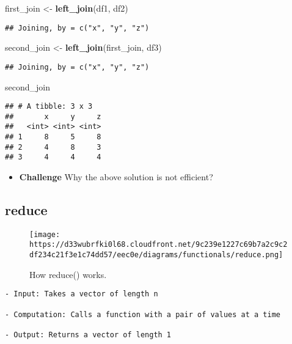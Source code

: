 \documentclass[
]{book}
\newenvironment{Shaded}{\begin{snugshade}}{\end{snugshade}}
\newcommand{\KeywordTok}[1]{\textcolor[rgb]{0.13,0.29,0.53}{\textbf{#1}}}
\newcommand{\NormalTok}[1]{#1}
\newcommand{\StringTok}[1]{\textcolor[rgb]{0.31,0.60,0.02}{#1}}
\providecommand{\tightlist}{%
  \setlength{\itemsep}{0pt}\setlength{\parskip}{0pt}}
\begin{document}
\begin{Shaded}
\begin{Highlighting}[]
\NormalTok{first\_join \textless{}{-}}\StringTok{ }\KeywordTok{left\_join}\NormalTok{(df1, df2)}
\end{Highlighting}
\end{Shaded}

\begin{verbatim}
## Joining, by = c("x", "y", "z")
\end{verbatim}

\begin{Shaded}
\begin{Highlighting}[]
\NormalTok{second\_join \textless{}{-}}\StringTok{ }\KeywordTok{left\_join}\NormalTok{(first\_join, df3)}
\end{Highlighting}
\end{Shaded}

\begin{verbatim}
## Joining, by = c("x", "y", "z")
\end{verbatim}

\begin{Shaded}
\begin{Highlighting}[]
\NormalTok{second\_join}
\end{Highlighting}
\end{Shaded}

\begin{verbatim}
## # A tibble: 3 x 3
##       x     y     z
##   <int> <int> <int>
## 1     8     5     8
## 2     4     8     3
## 3     4     4     4
\end{verbatim}

\begin{itemize}
\tightlist
\item
  \textbf{Challenge}
  Why the above solution is not efficient?
\end{itemize}

\hypertarget{reduce}{%
\subsection{reduce}\label{reduce}}

\begin{figure}
\centering
\texttt{[image: https://d33wubrfki0l68.cloudfront.net/9c239e1227c69b7a2c9c2df234c21f3e1c74dd57/eec0e/diagrams/functionals/reduce.png]}
\caption{How reduce() works.}
\end{figure}

\begin{verbatim}
- Input: Takes a vector of length n

- Computation: Calls a function with a pair of values at a time

- Output: Returns a vector of length 1
\end{verbatim}
\end{document}
